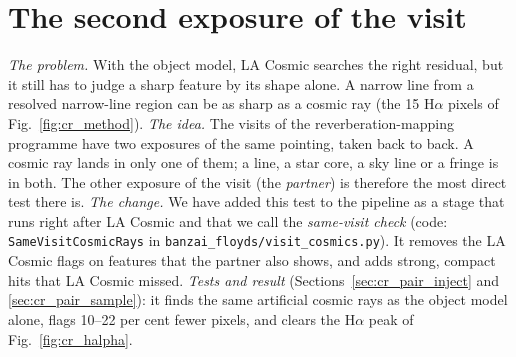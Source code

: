 \section{The second exposure of the visit}
\label{sec:cr_pair}
\textit{The problem.} With the object model, LA Cosmic searches the right residual, but it still has to judge a sharp
feature by its shape alone. A narrow line from a resolved narrow-line region can be as sharp as a cosmic ray (the 15
H$\alpha$ pixels of Fig.~\ref{fig:cr_method}). \textit{The idea.} The visits of the reverberation-mapping programme have
two exposures of the same pointing, taken back to back. A cosmic ray lands in only one of them; a line, a star core, a
sky line or a fringe is in both. The other exposure of the visit (the \textit{partner}) is therefore the most direct
test there is. \textit{The change.} We have added this test to the pipeline as a stage that runs right after LA Cosmic
and that we call the \textit{same-visit check} (code: \texttt{SameVisitCosmicRays} in
\texttt{banzai\_floyds/visit\_cosmics.py}). It removes the LA Cosmic flags on features that the partner also shows,
and adds strong, compact hits that LA Cosmic missed. \textit{Tests and result}
(Sections~\ref{sec:cr_pair_inject} and \ref{sec:cr_pair_sample}): it finds the same artificial cosmic rays as the
object model alone, flags 10--22 per cent fewer pixels, and clears the H$\alpha$ peak of
Fig.~\ref{fig:cr_halpha}.

